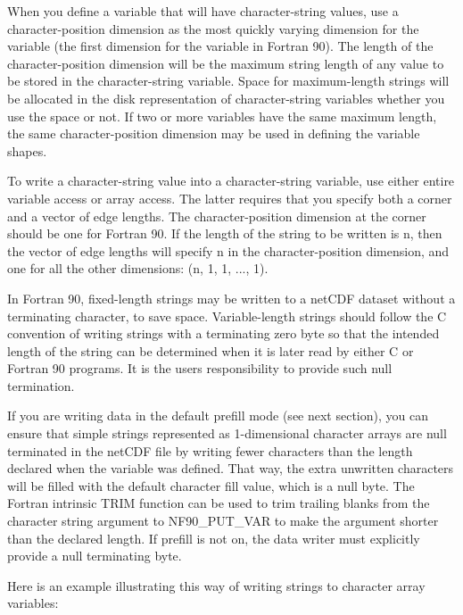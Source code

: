 When you define a variable that will have character-\/string values, use a character-\/position dimension as the most quickly varying dimension for the variable (the first dimension for the variable in Fortran 90). The length of the character-\/position dimension will be the maximum string length of any value to be stored in the character-\/string variable. Space for maximum-\/length strings will be allocated in the disk representation of character-\/string variables whether you use the space or not. If two or more variables have the same maximum length, the same character-\/position dimension may be used in defining the variable shapes.

To write a character-\/string value into a character-\/string variable, use either entire variable access or array access. The latter requires that you specify both a corner and a vector of edge lengths. The character-\/position dimension at the corner should be one for Fortran 90. If the length of the string to be written is n, then the vector of edge lengths will specify n in the character-\/position dimension, and one for all the other dimensions\+: (n, 1, 1, ..., 1).

In Fortran 90, fixed-\/length strings may be written to a net\+C\+DF dataset without a terminating character, to save space. Variable-\/length strings should follow the C convention of writing strings with a terminating zero byte so that the intended length of the string can be determined when it is later read by either C or Fortran 90 programs. It is the users responsibility to provide such null termination.

If you are writing data in the default prefill mode (see next section), you can ensure that simple strings represented as 1-\/dimensional character arrays are null terminated in the net\+C\+DF file by writing fewer characters than the length declared when the variable was defined. That way, the extra unwritten characters will be filled with the default character fill value, which is a null byte. The Fortran intrinsic T\+R\+IM function can be used to trim trailing blanks from the character string argument to N\+F90\+\_\+\+P\+U\+T\+\_\+\+V\+AR to make the argument shorter than the declared length. If prefill is not on, the data writer must explicitly provide a null terminating byte.

Here is an example illustrating this way of writing strings to character array variables\+:


